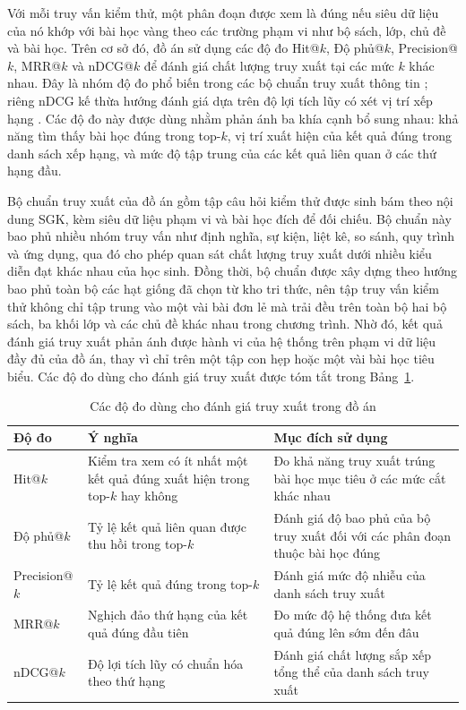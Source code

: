 \documentclass[../DoAn.tex]{subfiles}
\begin{document}
Với mỗi truy vấn kiểm thử, một phân đoạn được xem là đúng nếu siêu dữ liệu của nó khớp với bài học vàng theo các trường phạm vi như bộ sách, lớp, chủ đề và bài học. Trên cơ sở đó, đồ án sử dụng các độ đo Hit@$k$, Độ phủ@$k$, Precision@$k$, MRR@$k$ và nDCG@$k$ để đánh giá chất lượng truy xuất tại các mức $k$ khác nhau. Đây là nhóm độ đo phổ biến trong các bộ chuẩn truy xuất thông tin \cite{thakur2021beir}; riêng nDCG kế thừa hướng đánh giá dựa trên độ lợi tích lũy có xét vị trí xếp hạng \cite{jarvelin2002cumulated}. Các độ đo này được dùng nhằm phản ánh ba khía cạnh bổ sung nhau: khả năng tìm thấy bài học đúng trong top-$k$, vị trí xuất hiện của kết quả đúng trong danh sách xếp hạng, và mức độ tập trung của các kết quả liên quan ở các thứ hạng đầu.

Bộ chuẩn truy xuất của đồ án gồm tập câu hỏi kiểm thử được sinh bám theo nội dung SGK, kèm siêu dữ liệu phạm vi và bài học đích để đối chiếu. Bộ chuẩn này bao phủ nhiều nhóm truy vấn như định nghĩa, sự kiện, liệt kê, so sánh, quy trình và ứng dụng, qua đó cho phép quan sát chất lượng truy xuất dưới nhiều kiểu diễn đạt khác nhau của học sinh. Đồng thời, bộ chuẩn được xây dựng theo hướng bao phủ toàn bộ các hạt giống đã chọn từ kho tri thức, nên tập truy vấn kiểm thử không chỉ tập trung vào một vài bài đơn lẻ mà trải đều trên toàn bộ hai bộ sách, ba khối lớp và các chủ đề khác nhau trong chương trình. Nhờ đó, kết quả đánh giá truy xuất phản ánh được hành vi của hệ thống trên phạm vi dữ liệu đầy đủ của đồ án, thay vì chỉ trên một tập con hẹp hoặc một vài bài học tiêu biểu. Các độ đo dùng cho đánh giá truy xuất được tóm tắt trong Bảng~\ref{tab:retrieval-metrics-method}.

\begin{table}[H]
    \centering
    \renewcommand{\arraystretch}{1.25}
    \begin{tabular}{|p{}|p{}|p{}|}
        \hline
        \textbf{Độ đo} & \textbf{Ý nghĩa} & \textbf{Mục đích sử dụng} \\
        \hline
        Hit@$k$ & Kiểm tra xem có ít nhất một kết quả đúng xuất hiện trong top-$k$ hay không & Đo khả năng truy xuất trúng bài học mục tiêu ở các mức cắt khác nhau \\
        \hline
        Độ phủ@$k$ & Tỷ lệ kết quả liên quan được thu hồi trong top-$k$ & Đánh giá độ bao phủ của bộ truy xuất đối với các phân đoạn thuộc bài học đúng \\
        \hline
        Precision@$k$ & Tỷ lệ kết quả đúng trong top-$k$ & Đánh giá mức độ nhiễu của danh sách truy xuất \\
        \hline
        MRR@$k$ & Nghịch đảo thứ hạng của kết quả đúng đầu tiên & Đo mức độ hệ thống đưa kết quả đúng lên sớm đến đâu \\
        \hline
        nDCG@$k$ & Độ lợi tích lũy có chuẩn hóa theo thứ hạng & Đánh giá chất lượng sắp xếp tổng thể của danh sách truy xuất \\
        \hline
    \end{tabular}
    \vspace{0.2cm}
    \caption{Các độ đo dùng cho đánh giá truy xuất trong đồ án}
    \label{tab:retrieval-metrics-method}
\end{table}
\end{document}

